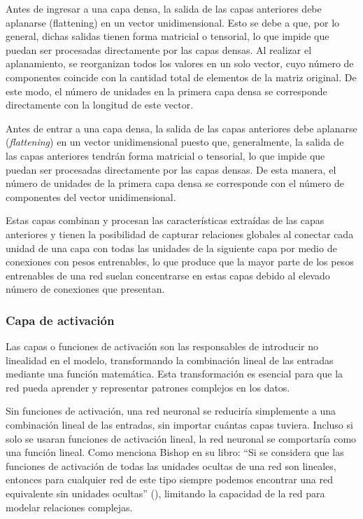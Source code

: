 Antes de ingresar a una capa densa, la salida de las capas anteriores debe aplanarse (flattening) en un vector unidimensional. Esto se debe a que, por lo general, dichas salidas tienen forma matricial o tensorial, lo que impide que puedan ser procesadas directamente por las capas densas. Al realizar el aplanamiento, se reorganizan todos los valores en un solo vector, cuyo número de componentes coincide con la cantidad total de elementos de la matriz original. De este modo, el número de unidades en la primera capa densa se corresponde directamente con la longitud de este vector.\newline

Antes de entrar a una capa densa, la salida de las capas anteriores debe aplanarse (\emph{flattening}) en un vector unidimensional puesto que, generalmente, la salida de las capas anteriores tendrán forma matricial o tensorial, lo que impide que puedan ser procesadas directamente por las capas densas. De esta manera, el número de unidades de la primera capa densa se corresponde con el número de componentes del vector unidimensional.\newline

Estas capas combinan y procesan las características extraídas de las capas anteriores y tienen la posibilidad de capturar relaciones globales al conectar cada unidad de una capa con todas las unidades de la siguiente capa por medio de conexiones con pesos entrenables, lo que produce que la mayor parte de los pesos entrenables de una red suelan concentrarse en estas capas debido al elevado número de conexiones que presentan.\newline

\subsubsection{Capa de activación}

Las capas o funciones de activación son las responsables de introducir no linealidad en el modelo, transformando la combinación lineal de las entradas mediante una función matemática. Esta transformación es esencial para que la red pueda aprender y representar patrones complejos en los datos.\newline

Sin funciones de activación, una red neuronal se reduciría simplemente a una combinación lineal de las entradas, sin importar cuántas capas tuviera. Incluso si solo se usaran funciones de activación lineal, la red neuronal se comportaría como una función lineal. Como menciona Bishop en su libro: ``Si se considera que las funciones de activación de todas las unidades ocultas de una red son lineales, entonces para cualquier red de este tipo siempre podemos encontrar una red equivalente sin unidades ocultas'' (\cite{Bishop2006}), limitando la capacidad de la red para modelar relaciones complejas.\newline

